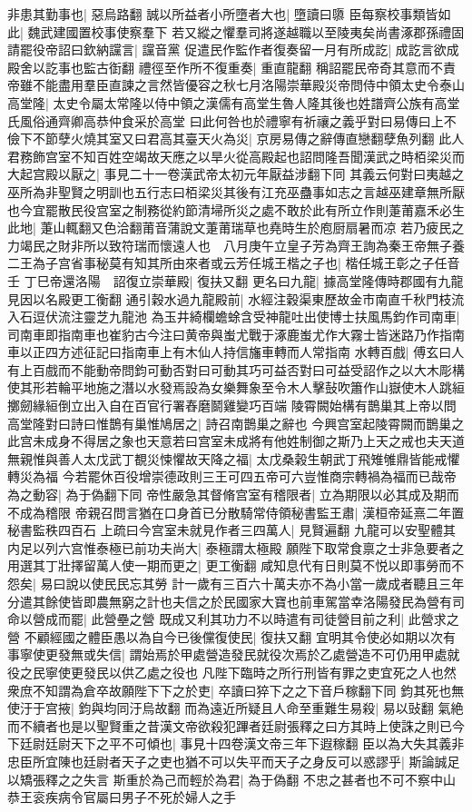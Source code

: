 非患其勤事也|{
	惡烏路翻}
誠以所益者小所墮者大也|{
	墮讀曰隳}
臣每察校事類皆如此|{
	魏武建國置校事使察羣下}
若又縱之懼羣司將遂越職以至陵夷矣尚書涿郡孫禮固請罷役帝詔曰欽納讜言|{
	讜音黨}
促遣民作監作者復奏留一月有所成訖|{
	成訖言欲成殿舍以訖事也監古衘翻}
禮徑至作所不復重奏|{
	重直龍翻}
稱詔罷民帝奇其意而不責帝雖不能盡用羣臣直諫之言然皆優容之秋七月洛陽崇華殿災帝問侍中領太史令泰山高堂隆|{
	太史令屬太常隆以侍中領之漢儒有高堂生魯人隆其後也姓譜齊公族有高堂氏風俗通齊卿高恭仲食采於高堂}
曰此何咎也於禮寧有祈禳之義乎對曰易傳曰上不儉下不節孽火燒其室又曰君高其臺天火為災|{
	京房易傳之辭傳直戀翻孽魚列翻}
此人君務飾宫室不知百姓空竭故天應之以旱火從高殿起也詔問隆吾聞漢武之時栢梁災而大起宫殿以厭之|{
	事見二十一卷漢武帝太初元年厭益涉翻下同}
其義云何對曰夷越之巫所為非聖賢之明訓也五行志曰栢梁災其後有江充巫蠱事如志之言越巫建章無所厭也今宜罷散民役宫室之制務從約節清埽所災之處不敢於此有所立作則萐莆嘉禾必生此地|{
	萐山輒翻又色洽翻莆音蒲說文萐莆瑞草也堯時生於庖厨扇暑而凉}
若乃疲民之力竭民之財非所以致符瑞而懷遠人也　八月庚午立皇子芳為齊王詢為秦王帝無子養二王為子宫省事秘莫有知其所由來者或云芳任城王楷之子也|{
	楷任城王彰之子任音壬}
丁巳帝還洛陽　詔復立崇華殿|{
	復扶又翻}
更名曰九龍|{
	據高堂隆傳時郡國有九龍見因以名殿更工衡翻}
通引穀水過九龍殿前|{
	水經注穀渠東歷故金市南直千秋門枝流入石逗伏流注靈芝九龍池}
為玉井綺欄蟾蜍含受神龍吐出使博士扶風馬鈞作司南車|{
	司南車即指南車也崔豹古今注曰黄帝與蚩尤戰于涿鹿蚩尤作大霧士皆迷路乃作指南車以正四方述征記曰指南車上有木仙人持信旛車轉而人常指南}
水轉百戲|{
	傅玄曰人有上百戲而不能動帝問鈞可動否對曰可動其巧可益否對曰可益受詔作之以大木彫構使其形若輪平地施之潛以水發焉設為女樂舞象至令木人擊鼔吹簫作山嶽使木人跳絙擲劒緣絙倒立出入自在百官行署舂磨鬬雞變巧百端}
陵霄闕始構有鵲巢其上帝以問高堂隆對曰詩曰惟鵲有巢惟鳩居之|{
	詩召南鵲巢之辭也}
今興宫室起陵霄闕而鵲巢之此宫未成身不得居之象也天意若曰宫室未成將有他姓制御之斯乃上天之戒也夫天道無親惟與善人太戊武丁覩災悚懼故天降之福|{
	太戊桑榖生朝武丁飛雉雊鼎皆能戒懼轉災為福}
今若罷休百役增崇德政則三王可四五帝可六豈惟商宗轉禍為福而已哉帝為之動容|{
	為于偽翻下同}
帝性嚴急其督脩宫室有稽限者|{
	立為期限以必其成及期而不成為稽限}
帝親召問言猶在口身首已分散騎常侍領秘書監王肅|{
	漢桓帝延熹二年置秘書監秩四百石}
上疏曰今宫室未就見作者三四萬人|{
	見賢遍翻}
九龍可以安聖體其内足以列六宫惟泰極已前功夫尚大|{
	泰極謂太極殿}
願陛下取常食禀之士非急要者之用選其丁壯擇留萬人使一期而更之|{
	更工衡翻}
咸知息代有日則莫不悦以即事勞而不怨矣|{
	易曰說以使民民忘其勞}
計一歲有三百六十萬夫亦不為小當一歲成者聽且三年分遣其餘使皆即農無窮之計也夫信之於民國家大寶也前車駕當幸洛陽發民為營有司命以營成而罷|{
	此營壘之營}
既成又利其功力不以時遣有司徒營目前之利|{
	此營求之營}
不顧經國之體臣愚以為自今已後儻復使民|{
	復扶又翻}
宜明其令使必如期以次有事寧使更發無或失信|{
	謂始焉於甲處營造發民就役次焉於乙處營造不可仍用甲處就役之民寧使更發民以供乙處之役也}
凡陛下臨時之所行刑皆有罪之吏宜死之人也然衆庶不知謂為倉卒故願陛下下之於吏|{
	卒讀曰猝下之之下音戶稼翻下同}
鈞其死也無使汙于宫掖|{
	鈞與均同汙烏故翻}
而為遠近所疑且人命至重難生易殺|{
	易以䜴翻}
氣絶而不續者也是以聖賢重之昔漢文帝欲殺犯蹕者廷尉張釋之曰方其時上使誅之則已今下廷尉廷尉天下之平不可傾也|{
	事見十四卷漢文帝三年下遐稼翻}
臣以為大失其義非忠臣所宜陳也廷尉者天子之吏也猶不可以失平而天子之身反可以惑謬乎|{
	斯論誠足以矯張釋之之失言}
斯重於為己而輕於為君|{
	為于偽翻}
不忠之甚者也不可不察中山恭王衮疾病令官屬曰男子不死於婦人之手

